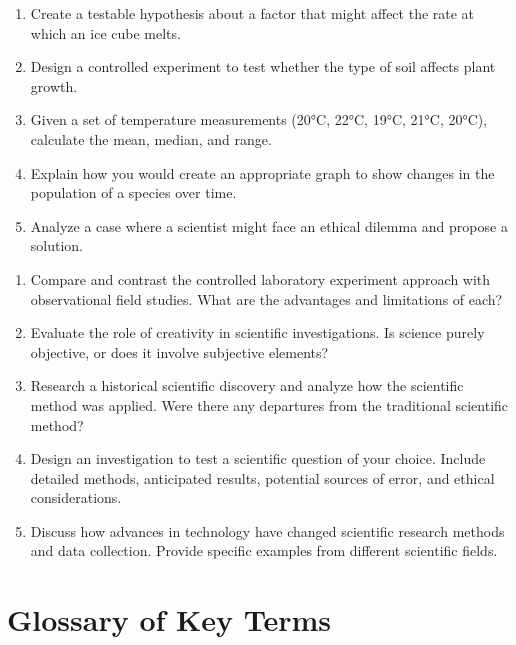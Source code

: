 \documentclass[justified,notoc]{tufte-book}
\newenvironment{tieredquestions}[1]{%
    \begin{tcolorbox}[colback=note!30,colframe=note!50,title=\textbf{Practice Questions - #1}]
}{%
    \end{tcolorbox}
}
\begin{document}
\begin{tieredquestions}{Level 2 - Application}
\begin{enumerate}
    \item Create a testable hypothesis about a factor that might affect the rate at which an ice cube melts.
    \item Design a controlled experiment to test whether the type of soil affects plant growth.
    \item Given a set of temperature measurements (20°C, 22°C, 19°C, 21°C, 20°C), calculate the mean, median, and range.
    \item Explain how you would create an appropriate graph to show changes in the population of a species over time.
    \item Analyze a case where a scientist might face an ethical dilemma and propose a solution.
\end{enumerate}
\end{tieredquestions}

\begin{tieredquestions}{Level 3 - Extension and Analysis}
\begin{enumerate}
    \item Compare and contrast the controlled laboratory experiment approach with observational field studies. What are the advantages and limitations of each?
    \item Evaluate the role of creativity in scientific investigations. Is science purely objective, or does it involve subjective elements?
    \item Research a historical scientific discovery and analyze how the scientific method was applied. Were there any departures from the traditional scientific method?
    \item Design an investigation to test a scientific question of your choice. Include detailed methods, anticipated results, potential sources of error, and ethical considerations.
    \item Discuss how advances in technology have changed scientific research methods and data collection. Provide specific examples from different scientific fields.
\end{enumerate}
\end{tieredquestions}

\section{Glossary of Key Terms}
\end{document}
